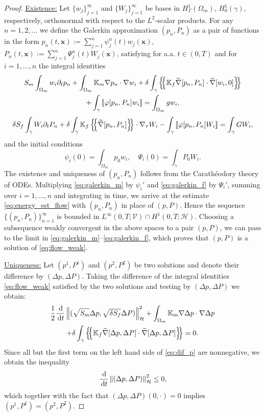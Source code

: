 \documentclass[a4paper]{article}
\def\agrad{\widetilde\nabla}
\def\avg#1{\left\{\mskip-5mu\left\{#1\right\}\mskip-5mu\right\}}
\def\d {\,{\rm d}}
\def\ddt#1{\frac{\d #1}{\d t}}
\def\dt{\prtl_t}
\def\Hf{\mathcal H}
\def\jmp#1{\left\llbracket #1 \right\rrbracket}
\def\norm#1{\left\|#1\right\|}
\def\pphi{{\varphi}}
\def\prtl{\partial}
\def\tn#1{{\mathbb{#1}}}    %
\def\Vf{{\mathcal V}} %
\def\vc#1{\mathbf{\boldsymbol{#1}}}     %
\def\xx{\vc x}
\newcommand{\eq}[1]{\begin{equation}#1\end{equation}}
\newcommand{\eqs}[1]{\begin{equation*}#1\end{equation*}}
\newcommand{\ml}[1]{\begin{multline}#1\end{multline}}
\begin{document}
\begin{proof}
\underline{Existence:}
Let $\{w_j\}_{j=1}^\infty$ and $\{W_j\}_{j=1}^\infty$ be bases in $H^1_\Gamma(\Omega_m)$, $H^1_0(\gamma)$, respectively, orthonormal with respect to the $L^2$-scalar products.
For any $n=1,2,...$ we define the Galerkin approximation $(p_n,P_n)$ as a pair of functions in the form $p_n(t,\xx):=\sum_{j=1}^n\psi_j^n(t)w_j(\xx)$, $P_n(t,\xx):=\sum_{j=1}^n\Psi_j^n(t)W_j(\xx)$, satisfying for a.a. $t\in(0,T)$ and for $i=1,...,n$ the integral identities
\ml{ \label{eq:galerkin_m} S_m\int_{\Omega_m}w_i\dt p_n + \int_{\Omega_m}\tn K_m\nabla p_n\cdot\nabla w_i + \delta\int_\gamma\avg{\tn K_f\agrad[p_n,P_n]\cdot\agrad[w_i,0]}\\
+ \int_\gamma\jmp{\pphi[p_n,P_n]w_i} = \int_{\Omega_m}g w_i, }
\eq{ \label{eq:galerkin_f} \delta S_f\int_\gamma W_i\dt P_n + \delta\int_\gamma\tn K_f\avg{\agrad[p_n,P_n]}\cdot\nabla_\tau W_i - \int_\gamma\jmp{\pphi[p_n,P_n]W_i} = \int_\gamma G W_i, }
and the initial conditions
\eqs{ \psi_i(0)=\int_{\Omega_m}p_0w_i, \quad \Psi_i(0)=\int_\gamma P_0W_i. }
The existence and uniqueness of $(p_n,P_n)$ follows from the Carath\'eodory theory of ODEs.
Multiplying \eqref{eq:galerkin_m} by $\psi_i'$ and \eqref{eq:galerkin_f} by $\Psi_i'$, summing over $i=1,...,n$ and integrating in time, we arrive at the estimate \eqref{eq:energy_est_flow} with $(p_n,P_n)$ in place of $(p,P)$.
Hence the sequence $\{(p_n,P_n)\}_{n=1}^\infty$ is bounded in $L^\infty(0,T;\Vf)\cap H^1(0,T;\Hf)$.
Choosing a subsequence weakly convergent in the above spaces to a pair $(p,P)$, we can pass to the limit in \eqref{eq:galerkin_m}--\eqref{eq:galerkin_f}, which proves that $(p,P)$ is a solution of \eqref{eq:flow_weak}.

\underline{Uniqueness:}
Let $(p^1,P^1)$ and $(p^2,P^2)$ be two solutions and denote their difference by $(\Delta p,\Delta P)$.
Taking the difference of the integral identities \eqref{eq:flow_weak} satisfied by the two solutions and testing by $(\Delta p,\Delta P)$ we obtain:
\ml{ \label{eq:dif_p} \frac12\ddt{}\norm{(\sqrt{S_m}\Delta p,\sqrt{\delta S_f}\Delta P)}_\Hf^2
+ \int_{\Omega_m}\tn K_m\nabla\Delta p\cdot\nabla\Delta p\\
+ \delta\int_\gamma\avg{\tn K_f\agrad[\Delta p,\Delta P]\cdot\agrad[\Delta p,\Delta P]} = 0. }
Since all but the first term on the left hand side of \eqref{eq:dif_p} are nonnegative, we obtain the inequality
\eqs{ \ddt{}\norm{(\Delta p,\Delta P)}_\Hf^2 \le 0, }
which together with the fact that $(\Delta p,\Delta P)(0,\cdot) = 0$ implies $(p^1,P^1)=(p^2,P^2)$.
\end{proof}
\end{document}
